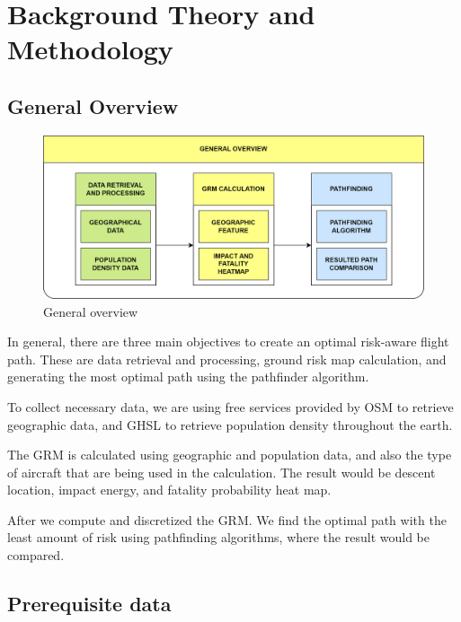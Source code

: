 \documentclass[12pt]{report}
\begin{document}
\chapter{Background Theory and Methodology}
    \section{General Overview}
        \begin{figure}[H]
            \centering
            \includegraphics[width=\textwidth]{General Image/OSM Drone-General Overview.png}
            \caption{General overview}
        \end{figure}

        In general, there are three main objectives to create an optimal risk-aware flight path. These are data
        retrieval and processing, ground risk map calculation, and generating the most optimal path using the pathfinder
        algorithm.

        To collect necessary data, we are using free services provided by \ac{OSM} \cite{noauthor_openstreetmap_2022} to retrieve geographic
        data, and \ac{GHSL} \cite{noauthor_global_2023} to retrieve population density throughout the earth.

        The \ac{GRM} is calculated using geographic and population data, and also the type of aircraft that are being used in
        the calculation. The result would be descent location, impact energy, and fatality probability heat map. 
        
        After we compute and discretized the GRM. We find the optimal path with the least amount of risk using
        pathfinding algorithms, where the result would be compared.

    \section{Prerequisite data}
\end{document}
